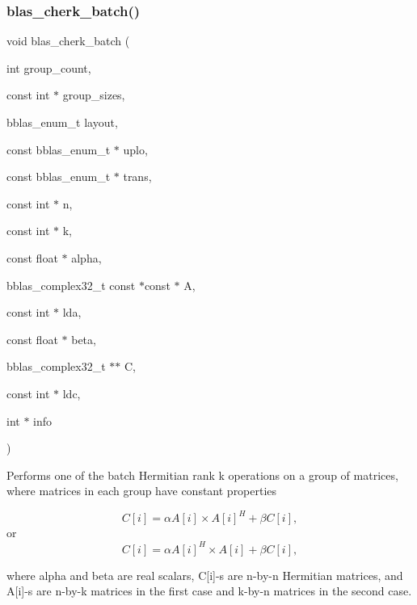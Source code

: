 \subsubsection{\texorpdfstring{blas\+\_\+cherk\+\_\+batch()}{blas\_cherk\_batch()}}
{\footnotesize\ttfamily void blas\+\_\+cherk\+\_\+batch (\begin{DoxyParamCaption}\item[{int}]{group\+\_\+count,  }\item[{const int $\ast$}]{group\+\_\+sizes,  }\item[{bblas\+\_\+enum\+\_\+t}]{layout,  }\item[{const bblas\+\_\+enum\+\_\+t $\ast$}]{uplo,  }\item[{const bblas\+\_\+enum\+\_\+t $\ast$}]{trans,  }\item[{const int $\ast$}]{n,  }\item[{const int $\ast$}]{k,  }\item[{const float $\ast$}]{alpha,  }\item[{bblas\+\_\+complex32\+\_\+t const $\ast$const $\ast$}]{A,  }\item[{const int $\ast$}]{lda,  }\item[{const float $\ast$}]{beta,  }\item[{bblas\+\_\+complex32\+\_\+t $\ast$$\ast$}]{C,  }\item[{const int $\ast$}]{ldc,  }\item[{int $\ast$}]{info }\end{DoxyParamCaption})}

Performs one of the batch Hermitian rank k operations on a group of matrices, where matrices in each group have constant properties

\[ C[i] = \alpha A[i] \times A[i]^H + \beta C[i], \] or \[ C[i] = \alpha A[i]^H \times A[i] + \beta C[i], \]

where alpha and beta are real scalars, C\mbox{[}i\mbox{]}-\/s are n-\/by-\/n Hermitian matrices, and A\mbox{[}i\mbox{]}-\/s are n-\/by-\/k matrices in the first case and k-\/by-\/n matrices in the second case.


